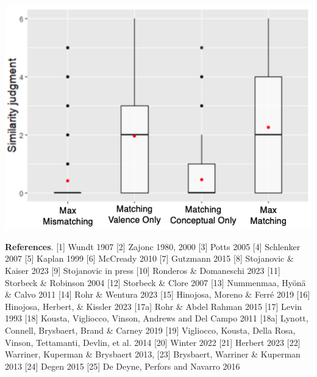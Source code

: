 \begin{tcolorbox}[colback=white]
\begin{minipage}{0.5\linewidth}
    \vspace{-.2cm}
    \includegraphics[scale=0.3]{figures/exp2.png}
    \vspace{-.2cm}
\end{minipage}
\begin{minipage}{0.45\linewidth}
    \label{fig:exp3}
    
\end{minipage}
\end{tcolorbox}

\noindent \textbf{References}.
[1] Wundt 1907
[2] Zajonc 1980, 2000
[3] Potts 2005 
[4] Schlenker 2007 
[5] Kaplan 1999 
[6] McCready 2010 
[7] Gutzmann 2015 
[8] Stojanovic \& Kaiser 2023 
[9] Stojanovic in press 
[10] Ronderos \& Domaneschi 2023 
[11] Storbeck \& Robinson 2004 
[12] Storbeck \& Clore 2007 
[13] Nummenmaa, Hyönä \& Calvo 2011 
[14] Rohr \& Wentura 2023 
[15] Hinojosa, Moreno \& Ferré 2019 
[16] Hinojosa, Herbert, \& Kissler 2023
[17a] Rohr \& Abdel Rahman 2015 
[17] Levin 1993
[18] Kousta, Vigliocco, Vinson, Andrews and Del Campo 2011 
[18a] Lynott, Connell, Brysbaert, Brand \& Carney 2019 
[19] Vigliocco, Kousta, Della Rosa, Vinson, Tettamanti, Devlin, et al. 2014 
[20] Winter 2022 
[21] Herbert 2023 
[22] Warriner, Kuperman \& Brysbaert 2013,
[23] Brysbaert, Warriner \& Kuperman 2013
[24] Degen 2015 
[25] De Deyne, Perfors and Navarro 2016




